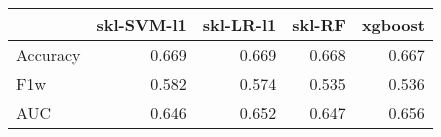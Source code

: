 \begin{tabular}{lrrrr}
\toprule
{} &  skl-SVM-l1 &  skl-LR-l1 &  skl-RF &  xgboost \\
\midrule
Accuracy &       0.669 &      0.669 &   0.668 &    0.667 \\
F1w      &       0.582 &      0.574 &   0.535 &    0.536 \\
AUC      &       0.646 &      0.652 &   0.647 &    0.656 \\
\bottomrule
\end{tabular}
